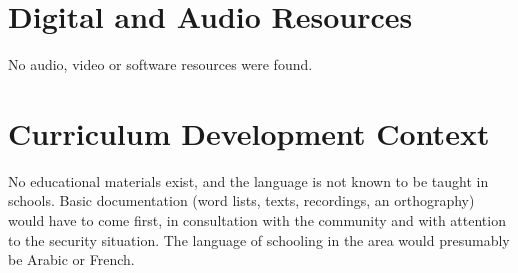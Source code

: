 \documentclass[12pt]{article}
\begin{document}
\section{Digital and Audio Resources}
No audio, video or software resources were found.

\section{Curriculum Development Context}
No educational materials exist, and the language is not known to be taught in schools. Basic documentation (word lists, texts, recordings, an orthography) would have to come first, in consultation with the community and with attention to the security situation. The language of schooling in the area would presumably be Arabic or French.
\end{document}
